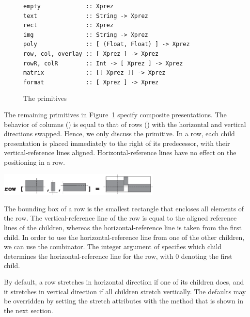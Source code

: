\documentclass[12pt]{article}
\begin{document}
\begin{figure}
\begin{footnotesize}
\begin{center}
\begin{footnotesize}
\begin{verbatim}
empty             :: Xprez
text              :: String -> Xprez             
rect              :: Xprez                       
img               :: String -> Xprez             
poly              :: [ (Float, Float) ] -> Xprez 
row, col, overlay :: [ Xprez ] -> Xprez          
rowR, colR        :: Int -> [ Xprez ] -> Xprez   
matrix            :: [[ Xprez ]] -> Xprez
format            :: [ Xprez ] -> Xprez
\end{verbatim}
\end{footnotesize}
\caption{The {\Xprez} primitives} \label{xprezprim} 
\end{center}
\end{footnotesize}
\end{figure}

The remaining primitives in Figure~\ref{xprezprim} specify composite presentations. The behavior of columns () is equal to that of rows () with the horizontal and vertical directions swapped. Hence, we only discuss the  primitive. In a row, each child presentation is placed immediately to the right of its predecessor, with their vertical-reference lines aligned. Horizontal-reference lines have no effect on the positioning in a row.

\begin{center}
\includegraphics[width=3.2in]{images/row}
\end{center}

The bounding box of a row is the smallest rectangle that encloses all elements of the row. The vertical-reference line of the row is equal to the aligned reference lines of the children, whereas the horizontal-reference line is taken from the first child. In order to use the horizontal-reference line from one of the other children, we can use the  combinator. The integer argument of  specifies which child determines the horizontal-reference line for the row, with 0 denoting the first child. 

By default, a row stretches in horizontal direction if one of its children does, and it stretches in vertical direction if all children stretch vertically. The defaults may be overridden by setting the stretch attributes with the method that is  shown in the next section. 
\end{document}
